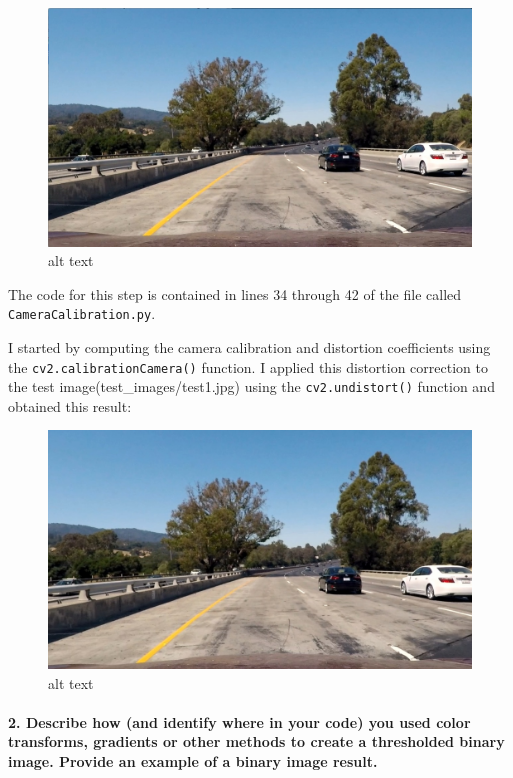 \documentclass[11pt]{article}
\makeatletter
\def\maxwidth{\ifdim\Gin@nat@width>\linewidth\linewidth
    \else\Gin@nat@width\fi}
\let\Oldincludegraphics\includegraphics
\renewcommand{\includegraphics}[1]{\Oldincludegraphics[width=.8\maxwidth]{#1}}
\makeatother
\begin{document}
\begin{figure}
\centering
\includegraphics{./test_images/test1.jpg}
\caption{alt text}
\end{figure}

The code for this step is contained in lines 34 through 42 of the file
called \texttt{CameraCalibration.py}.

I started by computing the camera calibration and distortion
coefficients using the \texttt{cv2.calibrationCamera()} function. I
applied this distortion correction to the test
image(test\_images/test1.jpg) using the \texttt{cv2.undistort()}
function and obtained this result:

\begin{figure}
\centering
\includegraphics{./output_images/test1_undist.jpg}
\caption{alt text}
\end{figure}

\paragraph{2. Describe how (and identify where in your code) you used
color transforms, gradients or other methods to create a thresholded
binary image. Provide an example of a binary image
result.}\label{describe-how-and-identify-where-in-your-code-you-used-color-transforms-gradients-or-other-methods-to-create-a-thresholded-binary-image.-provide-an-example-of-a-binary-image-result.}
\end{document}
